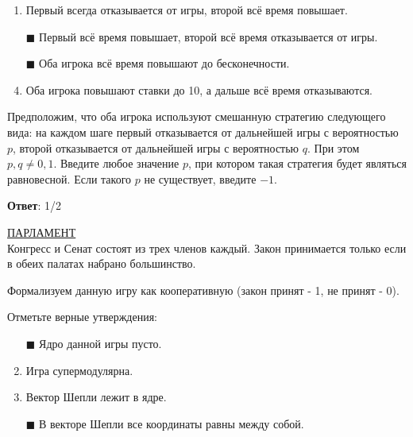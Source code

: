 \begin{enumerate}[label=$\square$]
	
	\item Первый всегда отказывается от игры, второй всё время повышает.
	\item[$\blacksquare$] Первый всё время повышает, второй всё время отказывается от игры.
	\item[$\blacksquare$] Оба игрока всё время повышают до бесконечности.
	\item Оба игрока повышают ставки до 10, а дальше всё время отказываются.
\end{enumerate}

\task
Предположим, что оба игрока используют смешанную стратегию следующего вида: на каждом шаге первый отказывается от дальнейшей игры с вероятностью $p$, второй отказывается от дальнейшей игры с вероятностью $q$. При этом $p,q \neq 0,1$. Введите любое значение $p$, при котором такая стратегия будет являться равновесной. Если такого $p$ не существует, введите $-1$.

\textbf{Ответ}:
1/2

\task
\underline{ПАРЛАМЕНТ} \\

Конгресс и Сенат состоят из трех членов каждый. Закон принимается только если в обеих палатах набрано большинство.

Формализуем данную игру как кооперативную (закон принят - 1, не принят - 0).

Отметьте верные утверждения:

\begin{enumerate}[label=$\square$]
	\item[$\blacksquare$] Ядро данной игры пусто.
	\item Игра супермодулярна.
	\item Вектор Шепли лежит в ядре.
	\item[$\blacksquare$] В векторе Шепли все координаты равны между собой.
\end{enumerate}

